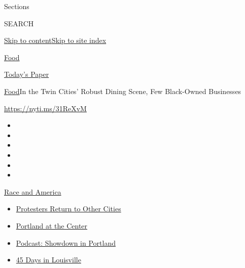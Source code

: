 Sections

SEARCH

\protect\hyperlink{site-content}{Skip to
content}\protect\hyperlink{site-index}{Skip to site index}

\href{https://www.nytimes3xbfgragh.onion/section/food}{Food}

\href{https://myaccount.nytimes3xbfgragh.onion/auth/login?response_type=cookie\&client_id=vi}{}

\href{https://www.nytimes3xbfgragh.onion/section/todayspaper}{Today's
Paper}

\href{/section/food}{Food}\textbar{}In the Twin Cities' Robust Dining
Scene, Few Black-Owned Businesses

\url{https://nyti.ms/31ReXvM}

\begin{itemize}
\item
\item
\item
\item
\item
\item
\end{itemize}

\href{https://www.nytimes3xbfgragh.onion/news-event/george-floyd-protests-minneapolis-new-york-los-angeles?action=click\&pgtype=Article\&state=default\&region=TOP_BANNER\&context=storylines_menu}{Race
and America}

\begin{itemize}
\tightlist
\item
  \href{https://www.nytimes3xbfgragh.onion/2020/07/26/us/protests-portland-seattle-trump.html?action=click\&pgtype=Article\&state=default\&region=TOP_BANNER\&context=storylines_menu}{Protesters
  Return to Other Cities}
\item
  \href{https://www.nytimes3xbfgragh.onion/2020/07/24/us/portland-oregon-protests-white-race.html?action=click\&pgtype=Article\&state=default\&region=TOP_BANNER\&context=storylines_menu}{Portland
  at the Center}
\item
  \href{https://www.nytimes3xbfgragh.onion/2020/07/23/podcasts/the-daily/portland-protests.html?action=click\&pgtype=Article\&state=default\&region=TOP_BANNER\&context=storylines_menu}{Podcast:
  Showdown in Portland}
\item
  \href{https://www.nytimes3xbfgragh.onion/interactive/2020/07/16/us/black-lives-matter-protests-louisville-breonna-taylor.html?action=click\&pgtype=Article\&state=default\&region=TOP_BANNER\&context=storylines_menu}{45
  Days in Louisville}
\end{itemize}

